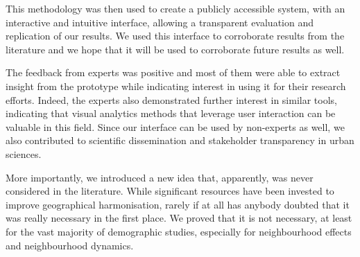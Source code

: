 \documentclass[10pt,letterpaper]{article}
\newcommand{\censure}[1]{}
\begin{document}
This methodology was then used to create a publicly accessible system, with an
interactive and intuitive interface, allowing a transparent evaluation and
replication of our results. We used this interface to corroborate results from
the literature and we hope that it will be used to corroborate future results as
well. 

The feedback from experts was positive and most of them were able to extract
insight from the prototype while indicating interest in using it for their
research efforts. Indeed, the experts also demonstrated further interest in
similar tools, indicating that visual analytics methods that leverage user
interaction can be valuable in this field.  Since our interface can be used by
non-experts as well, we also contributed to scientific dissemination and
stakeholder transparency in urban sciences.


More importantly, we introduced a new idea that, apparently, was never
considered in the literature. While significant resources have been invested to
improve geographical harmonisation, rarely if at all has anybody doubted that it was really necessary in the first place. We proved that it is not necessary, at least for the vast majority of demographic studies, especially for  neighbourhood effects and neighbourhood
dynamics.

\censure{
\section*{Acknowledgement}
This research was supported by a University of Toronto Connaught Global
Challenge grant and is part of the Urban Genome Project. The authors thank Cary
Wu, Ethan Fosse, Fernando Calderón Figueroa, Patrick Adler, and James Murdoch
for their expert opinions; Mark S. Fox, Robert M. Wright, Ultan Byrne, Matti
Siemiatycki, Shauna Brail, and Richard Florida for general guidance and support;
and the anonymous reviewers for their constructive comments.
}



\end{document}
